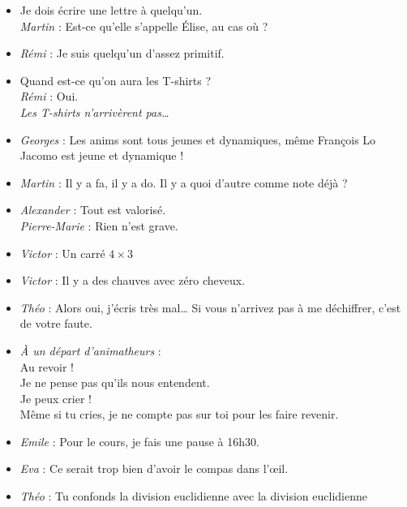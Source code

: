 \begin{itemize}
\item \og Je dois écrire une lettre à quelqu'un. \fg \\
\textit{Martin} : \og Est-ce qu'elle s'appelle Élise, au cas où ? \fg

\item \textit{Rémi} : \og Je suis quelqu'un d'assez primitif. \fg

 \item \og Quand est-ce qu'on aura les T-shirts ? \fg \\
\textit{Rémi} : \og Oui. \fg \\
\textit{Les T-shirts n'arrivèrent pas…}

\item \textit{Georges} : \og Les anims sont tous jeunes et dynamiques, même François Lo Jacomo est jeune et dynamique ! \fg

\item \textit{Martin} : \og Il y a fa, il y a do. Il y a quoi d'autre comme note déjà ? \fg

\item \textit{Alexander} : \og Tout est valorisé. \fg \\
\textit{Pierre-Marie} : \og Rien n'est grave. \fg

\item \textit{Victor} : \og Un carré $4\times 3$ \fg

\item \textit{Victor} : \og Il y a des chauves avec zéro cheveux. \fg

\item \textit{Théo} : \og Alors oui, j'écris très mal… Si vous n'arrivez pas à me déchiffrer, c'est de votre faute. \fg

\item \textit{À un départ d'animatheurs} : \\
\og Au revoir ! \fg \\
\og Je ne pense pas qu'ils nous entendent. \fg \\
\og Je peux crier ! \fg \\
\og Même si tu cries, je ne compte pas sur toi pour les faire revenir. \fg

\item \textit{Emile} : \og Pour le cours, je fais une pause à 16h30. \fg

\item \textit{Eva} : \og Ce serait trop bien d'avoir le compas dans l'œil. \fg

\item \textit{Théo} : \og Tu confonds la division euclidienne avec la division euclidienne \fg


\end{itemize}
